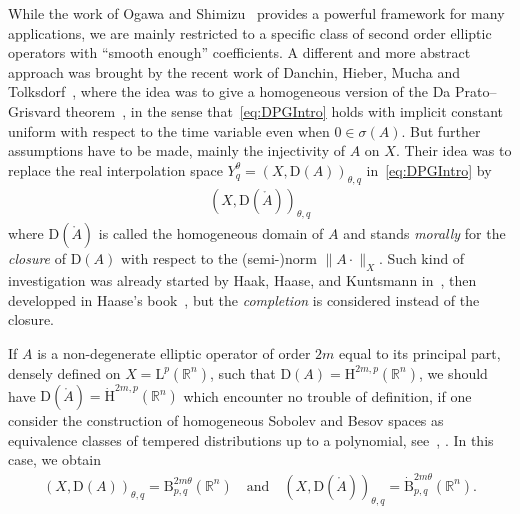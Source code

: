 \documentclass[10pt]{amsart}
\theoremstyle{definition}\newtheorem{defi}[theo]{Definition}\newtheorem{rema}[theo]{Remark}\newtheorem{exam}[theo]{Example}\newtheorem{exem}[theo]{Example}\newtheorem{nota}[theo]{Notation}
\newcommand{\bbR}{\mathbb{R}}
\newcommand{\rmH}{\mathrm{H}}%
\newcommand{\rmB}{\mathrm{B}}
\newcommand{\rmD}{\mathrm{D}}
\newcommand{\rmL}{\mathrm{L}}
\newcommand{\rgA}{\mathring{A}}
\begin{document}
While the work of Ogawa and Shimizu~\cite{OgawaShimizu2022} provides a powerful framework for many applications, we are mainly restricted to a specific class of second order elliptic operators with ``smooth enough'' coefficients. A different and more abstract approach was brought by the recent work of Danchin, Hieber, Mucha and Tolksdorf~\cite{DanchinHieberMuchaTolk2020}, where the idea was to give a homogeneous version of the Da Prato--Grisvard theorem~\cite[Theorem~4.15]{DaPratoGrisvard1975}, in the sense that~\eqref{eq:DPGIntro} holds with implicit constant uniform with respect to the time variable even when $0\in\sigma(A)$. But further assumptions have to be made, mainly the injectivity of $A$ on $X$. Their idea was to replace the real interpolation space $Y^{\theta}_q=(X,\rmD(A))_{\theta,q}$ in~\eqref{eq:DPGIntro} by
\begin{align*}
\left(X,\rmD(\rgA)\right)_{\theta,q}
\end{align*}
where $\rmD(\rgA)$ is called the homogeneous domain of $A$ and stands \emph{morally} for the \emph{closure} of $\rmD(A)$ with respect to the (semi-)norm $\| A \cdot \|_X$. Such kind of investigation was already started by Haak, Haase, and Kuntsmann in~\cite{HaakHaaseKunstmann2006}, then developped in Haase's book~\cite[Chapter~6]{bookHaase2006}, but the \emph{completion} is considered instead of the closure.

If $A$ is a non-degenerate elliptic operator of order $2m$ equal to its principal part, densely defined on $X=\rmL^{p}(\bbR^n)$, such that $\rmD({A})=\rmH^{2m,p}(\bbR^n)$, we should have $\rmD(\rgA)=\dot{\rmH}^{2m,p}(\bbR^n)$ which encounter no trouble of definition, if one consider the construction of homogeneous Sobolev and Besov spaces as equivalence classes of tempered distributions up to a polynomial, see~\cite[Chapter~8,~Section~3]{bookHaase2006}, \cite[Chapter~5]{bookTriebel1983}. In this case, we obtain
\begin{align*}
(X,\rmD({A}))_{\theta,q} = {\rmB}^{2m\theta}_{p,q}\left(\bbR^n\right) \quad\text{and}\quad \left(X,\rmD(\rgA)\right)_{\theta,q} = \dot{\rmB}^{2m\theta}_{p,q}\left(\bbR^n\right) .
\end{align*}
\end{document}
